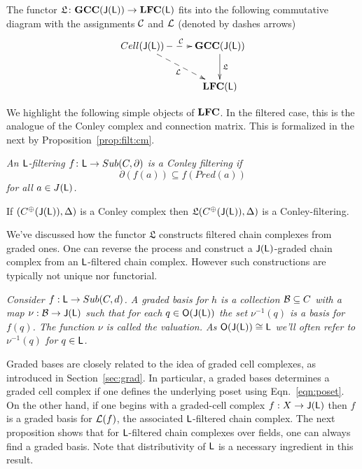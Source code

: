 \begin{prop}\label{prop:filt:functor2}
The functor $\mathfrak{L}\colon {\bf GCC}({\mathsf J}({\mathsf L}))\to {\bf LFC}({\mathsf L})$ fits into the following commutative diagram with the assignments ${\mathcal C}$ and ${\mathcal L}$ (denoted by dashes arrows)
\[
\xymatrixrowsep{0.35in}
\xymatrixcolsep{0.35in}
\xymatrix{
Cell(\sJ(\sL)) \ar@{-->}[dr]_{\cL} \ar@{-->}[r]^{\cC} & {\bf GCC(\sJ(\sL))} \ar[d]^{\mathfrak{L}} \\
 & {\bf LFC(\sL)}
}
\]
\end{prop}

We highlight the following simple objects of ${\bf LFC}$. In the filtered case, this is the analogue of the Conley complex and connection matrix.  This is formalized in the next by Proposition~\ref{prop:filt:cm}.



\begin{defn}
{\em 
An ${\mathsf L}$-filtering $f\colon {\mathsf L} \to Sub(C,\partial)$ is a \em{Conley filtering} if
\[
\partial(f(a)) \subseteq f(Pred(a))
\]
for all $a\in J({\mathsf L})$.
}
\end{defn}



\begin{prop}\label{prop:filt:cm}
If $(C^\oplus({\mathsf J}({\mathsf L})),\Delta)$ is a Conley complex then $\mathfrak{L}(C^\oplus({\mathsf J}({\mathsf L})),\Delta)$ is a Conley-filtering.
\end{prop}



We've discussed how the functor $\mathfrak{L}$ constructs filtered chain complexes from graded ones.  One can reverse the process and construct a ${\mathsf J}({\mathsf L})$-graded chain complex from an ${\mathsf L}$-filtered chain complex.  However such constructions are typically not unique nor functorial.


\begin{defn}
{\em
Consider $f:{\mathsf L}\to Sub(C,d)$.  A {\em graded basis for $h$} is a collection ${\mathcal B}\subseteq C$ with a map $\nu:{\mathcal B}\to {\mathsf J}({\mathsf L})$ such that for each $q\in {\mathsf O}({\mathsf J}({\mathsf L}))$ the set $\nu^{-1}(q)$ is a basis for $f(q)$.
 The function $\nu$ is called the {\em valuation}. As ${\mathsf O}({\mathsf J}({\mathsf L})) \cong {\mathsf L}$ we'll often refer to $\nu^{-1}(q)$ for $q\in {\mathsf L}$.  
}
\end{defn}

Graded bases are closely related to the idea of graded cell complexes, as introduced in Section~\ref{sec:grad}.  In particular, a graded bases determines a graded cell complex if one defines the underlying poset using Eqn.~\ref{eqn:poset}.  On the other hand, if one begins with a graded-cell complex $f:X\to {\mathsf J}({\mathsf L})$ then $f$ is a graded basis for ${\mathcal L}(f)$, the associated ${\mathsf L}$-filtered chain complex.   The next proposition shows that for ${\mathsf L}$-filtered chain complexes over fields, one can always find a graded basis.  Note that distributivity of ${\mathsf L}$ is a necessary ingredient in this result.

